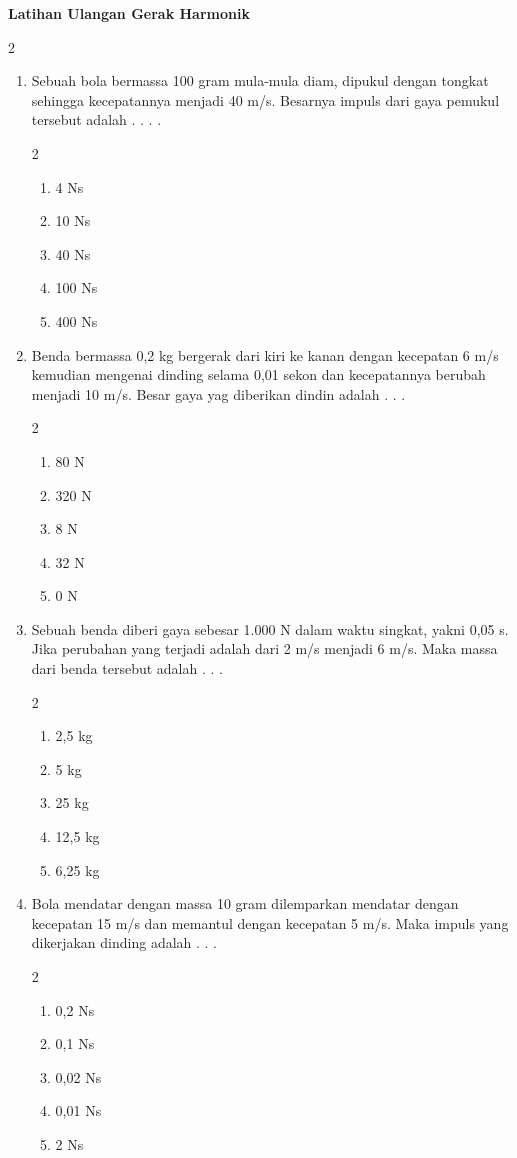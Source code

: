 \documentclass[10pt,a4paper]{extarticle}
\newcommand{\pilgani}[1]{                            \vspace{-0.3cm}\begin{multicols}{2}
 \begin{enumerate}[label=\Alph*., itemsep=0pt,topsep=0pt,leftmargin=*,align=Center]#1                     \end{enumerate}
 \phantom{ini cuma sapi, wedus, dan ayam}
 \end{multicols}}
\begin{document}
 \textbf{Latihan Ulangan Gerak Harmonik} \phantom{ini nama siswa yang aaamengerjakan soal kuis ini }  

\begin{multicols*}{2}\raggedcolumns

\begin{enumerate}
\item Sebuah bola bermassa 100 gram mula-mula diam, dipukul dengan tongkat sehingga kecepatannya menjadi 40 m/s. Besarnya impuls dari gaya pemukul tersebut adalah . . . . 
\pilgani{
   \item 4 Ns
   \item 10 Ns
   \item 40 Ns
   \item 100 Ns
   \item 400 Ns
}
\vspace{1.5cm}

\item Benda bermassa 0,2 kg bergerak dari kiri ke kanan dengan kecepatan 6 m/s kemudian mengenai dinding selama 0,01 sekon dan kecepatannya berubah menjadi 10 m/s. Besar gaya yag diberikan dindin adalah . . . 
\pilgani{
   \item 80 N
   \item 320 N
   \item 8 N
   \item 32 N
   \item 0 N
}
\vspace{1.5cm}

\item  Sebuah benda diberi gaya sebesar 1.000 N dalam waktu singkat, yakni 0,05 s. Jika perubahan yang terjadi adalah dari 2 m/s menjadi 6 m/s. Maka massa dari benda tersebut adalah . . .
\pilgani{
   \item 2,5 kg
   \item 5 kg
   \item 25 kg
   \item 12,5 kg
   \item 6,25 kg
}
\vspace{1.5cm}

\item Bola mendatar dengan massa 10 gram dilemparkan mendatar dengan kecepatan 15 m/s dan memantul dengan kecepatan 5 m/s. Maka impuls yang dikerjakan dinding adalah . . .
\pilgani{
   \item 0,2 Ns
   \item 0,1 Ns
   \item 0,02 Ns
   \item 0,01 Ns
   \item 2 Ns
}
\vspace{1.5cm}


\end{enumerate}
\end{multicols*}
\end{document}
